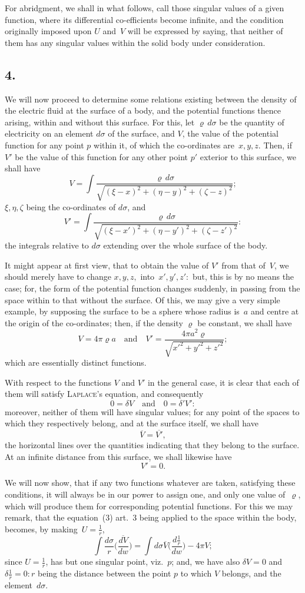 \documentclass[12pt,notitlepage]{amsart}
\let\Person\textsc
\newcommand\Section[1]{\subsection{{#1}}}
\renewcommand{\rho}{\varrho}
\begin{document}
For abridgment, we shall in what follows, call those singular values
of a given function, where its differential co-efficients become infinite, and
the condition originally imposed upon $U$ and~$V$ will be expressed by saying,
that neither of them has any singular values within the solid body under
consideration.
\bigskip

\Section{4.}
We will now proceed to determine some relations existing between the
density of the electric fluid at the surface of a body,
and the potential functions
thence arising, within and without this surface. For this,
let $\rho\,d\sigma$ be the
quantity of electricity on an element $d\sigma$
of the surface, and $V$, the value of
the potential function for any point $p$ within it, of which the co-ordinates
are~$x,y,z$. Then, if $V'$ be the value
of this function for any other point $p'$
exterior to this surface, we shall have
\[
V=\int\frac{\rho\,d\sigma}
{\sqrt{(\xi-x)^2+(\eta-y)^2+(\zeta-z)^2}};
\]
$\xi,\eta,\zeta$ being the co-ordinates of $d\sigma$, and
\[
V'=\int\frac{\rho\,d\sigma}
{\sqrt{(\xi-x')^2+(\eta-y')^2+(\zeta-z')^2}}:
\]
the integrals relative to $d\sigma$
extending over the whole surface of the body.

It might appear at first view, that to obtain the value of $V'$ from that
of~$V$, we should merely have to change
$x,y,z,$ into~$x',y',z':$ but, this is
by no means the case; for, the form of
the potential function changes suddenly,
in passing from the space within to that without the surface. Of this, we may
give a very simple example, by supposing the surface to be a sphere whose
radius is~$a$ and centre at the origin of the co-ordinates;
then, if the density $\rho$
be constant, we shall have
\[
V=4\pi\rho a
\quad\text{and}\quad
V'=\frac{4\pi a^2\rho}{\sqrt{x'^2+y'^2+z'^2}};
\]
which are essentially distinct functions.

With respect to the functions $V$ and $V'$ in the general case, it is
clear that each of them will satisfy \Person{Laplace}'s
equation, and consequently
\[
0=\delta V
\quad\text{and}\quad
0=\delta' V':
\]
moreover, neither of them will have singular values; for any point of the
spaces to which they respectively belong, and at the surface itself, we shall
have
\[
\overline{V}=\overline{V'},
\]
the horizontal lines over the quantities indicating that they belong to the 
surface. At an infinite distance from this surface, we shall likewise have
\[
V'=0.
\]

We will now show, that if any two functions whatever are taken,
satisfying these conditions, it will always be in our power to assign one, and
only one value of~$\rho$, which will produce them for corresponding potential
functions. For this we may remark, that the equation~(3) art.~3 being applied
to the space within the body, becomes, by making~$U=\frac1r$,
\[
\int \frac{d\sigma}{r}\biggl(\frac{\overline{dV}}{dw}\biggr)=
\int d\sigma\overline{V}\biggl(\frac{d\frac1r}{dw}\biggr)-4\pi V;
\]
since $U=\frac1r$, has but one singular point, viz.~$p$;
and, we have also $\delta V=0$
and~$\delta\frac1r=0:r$ being the distance
between the point $p$ to which $V$ belongs,
and the element~$d\sigma$.
\end{document}
